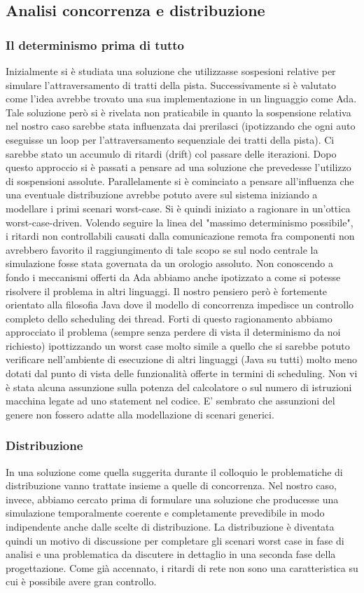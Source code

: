 \subsection{Analisi concorrenza e distribuzione}
\subsubsection{Il determinismo prima di tutto}
Inizialmente si è studiata una soluzione che utilizzasse sospesioni relative per simulare l'attraversamento di tratti della pista. Successivamente si è valutato come l'idea avrebbe trovato una sua implementazione in un linguaggio come Ada.
Tale soluzione però si è rivelata non praticabile in quanto la sospensione relativa nel nostro caso sarebbe stata influenzata dai prerilasci (ipotizzando che ogni auto eseguisse un loop per l’attraversamento sequenziale dei tratti della pista). Ci sarebbe stato un accumulo di ritardi (drift) col passare delle iterazioni. Dopo questo approccio si è passati a pensare ad una soluzione che prevedesse l'utilizzo di sospensioni assolute. Parallelamente si è cominciato a pensare all'influenza che una eventuale distribuzione avrebbe potuto avere sul sistema iniziando a modellare i primi scenari worst-case.
Si è quindi iniziato a ragionare in un’ottica worst-case-driven.
Volendo seguire la linea del "massimo determinismo possibile", i ritardi non controllabili causati dalla comunicazione remota fra componenti non avrebbero favorito il raggiungimento di tale scopo se sul nodo centrale la simulazione fosse stata governata da un orologio assoluto. Non conoscendo a fondo i meccanismi offerti da Ada abbiamo anche ipotizzato a come si potesse risolvere il problema in altri linguaggi.
Il nostro pensiero però è fortemente orientato alla filosofia Java dove il modello di concorrenza impedisce un controllo completo dello scheduling dei thread.
Forti di questo ragionamento abbiamo approcciato il problema (sempre senza perdere di vista il determinismo da noi richiesto)  ipottizzando un worst case molto simile a quello che si sarebbe potuto verificare nell’ambiente di esecuzione di altri linguaggi (Java su tutti) molto meno dotati dal punto di vista delle funzionalità offerte in termini di scheduling.
Non vi è stata alcuna assunzione sulla potenza del calcolatore o sul numero di istruzioni macchina legate ad uno statement nel codice. E’ sembrato che assunzioni del genere non fossero adatte alla modellazione di scenari generici.
\subsubsection{Distribuzione}
In una soluzione come quella suggerita durante il colloquio le problematiche di distribuzione vanno trattate insieme a quelle di concorrenza.
Nel nostro caso, invece, abbiamo cercato prima di formulare una soluzione che producesse una simulazione temporalmente coerente e completamente prevedibile in modo indipendente anche dalle scelte di distribuzione. La distribuzione è diventata quindi un motivo di discussione per completare gli scenari worst case in fase di analisi e una problematica da discutere in dettaglio in una seconda fase della progettazione. Come già accennato, i ritardi di rete non sono una caratteristica su cui è possibile avere gran controllo.
